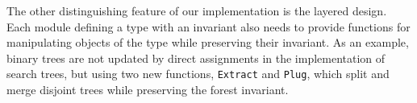 \documentclass{llncs}
\begin{document}



The other distinguishing feature of our implementation is the layered design. Each module
defining a type with an invariant also needs to provide functions for
manipulating objects of the type while preserving their invariant. As an example,
binary trees are not updated by direct assignments in the implementation of search
trees, but using two new functions, \texttt{Extract} and
\texttt{Plug}, which split and merge disjoint trees while preserving the forest invariant.
\end{document}
